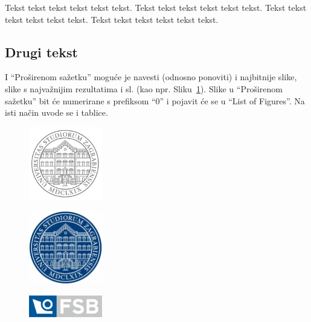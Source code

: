 \documentclass[a4paper,12pt]{report}
\begin{document}
\begin{prosirenisazetak}
Tekst tekst tekst tekst tekst tekst.
Tekst tekst tekst tekst tekst tekst.
Tekst tekst tekst tekst tekst tekst.
Tekst tekst tekst tekst tekst tekst.
 

\subsection*{Drugi tekst}
I ``Proširenom sažetku'' moguće je navesti (odnosno ponoviti) i najbitnije slike, slike s
najvažnijim rezultatima i sl. (kao npr. Sliku~\ref{fig:ps.1}).
Slike u ``Proširenom sažetku'' bit će numerirane s prefiksom ``0'' i pojavit
će se u ``List of Figures''. Na isti način uvode se i tablice.
\begin{figure}
  \centering
  \includegraphics[height=3.2cm]{unizg_sivi_t4s}\\
  \label{fig:ps.1}
\end{figure}

\begin{figure}
  \centering
  \includegraphics[height=3.2cm]{unizg_plavi_t2}\\
\end{figure}

\begin{figure}
  \centering
  \includegraphics[width=3.2cm]{fsb_logo_n}\\
\end{figure}


\end{prosirenisazetak}
\end{document}
